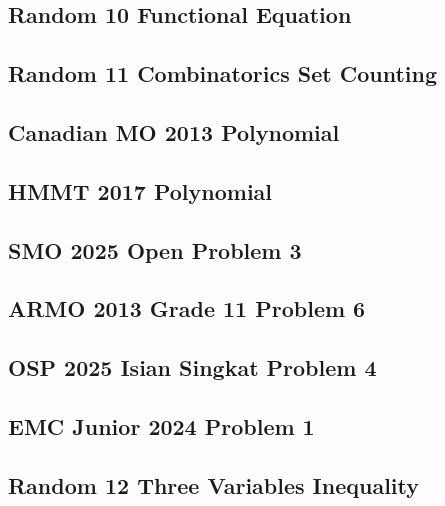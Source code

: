 \subsection{Random 10 Functional Equation}

\newpage

\subsection{Random 11 Combinatorics Set Counting}

\newpage

\subsection{Canadian MO 2013 Polynomial}

\newpage

\subsection{HMMT 2017 Polynomial}

\newpage

\subsection{SMO 2025 Open Problem 3}

\newpage

\subsection{ARMO 2013 Grade 11 Problem 6}

\newpage

\subsection{OSP 2025 Isian Singkat Problem 4}

\newpage

\subsection{EMC Junior 2024 Problem 1}

\newpage

\subsection{Random 12 Three Variables Inequality}

\newpage

